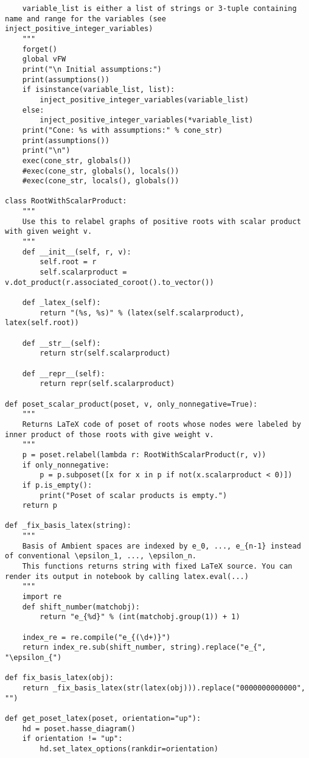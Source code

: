 \begin{verbatim}
    variable_list is either a list of strings or 3-tuple containing name and range for the variables (see inject_positive_integer_variables)
    """
    forget()
    global vFW
    print("\n Initial assumptions:")
    print(assumptions())
    if isinstance(variable_list, list):
        inject_positive_integer_variables(variable_list)
    else:
        inject_positive_integer_variables(*variable_list)
    print("Cone: %s with assumptions:" % cone_str)
    print(assumptions())
    print("\n")
    exec(cone_str, globals())
    #exec(cone_str, globals(), locals())
    #exec(cone_str, locals(), globals())

class RootWithScalarProduct:
    """
    Use this to relabel graphs of positive roots with scalar product with given weight v.
    """
    def __init__(self, r, v):
        self.root = r
        self.scalarproduct = v.dot_product(r.associated_coroot().to_vector())

    def _latex_(self):
        return "(%s, %s)" % (latex(self.scalarproduct), latex(self.root))

    def __str__(self):
        return str(self.scalarproduct)

    def __repr__(self):
        return repr(self.scalarproduct)

def poset_scalar_product(poset, v, only_nonnegative=True):
    """
    Returns LaTeX code of poset of roots whose nodes were labeled by inner product of those roots with give weight v.
    """
    p = poset.relabel(lambda r: RootWithScalarProduct(r, v))
    if only_nonnegative:
        p = p.subposet([x for x in p if not(x.scalarproduct < 0)])
    if p.is_empty():
        print("Poset of scalar products is empty.")
    return p

def _fix_basis_latex(string):
    """
    Basis of Ambient spaces are indexed by e_0, ..., e_{n-1} instead of conventional \epsilon_1, ..., \epsilon_n.
    This functions returns string with fixed LaTeX source. You can render its output in notebook by calling latex.eval(...)
    """
    import re
    def shift_number(matchobj):
        return "e_{%d}" % (int(matchobj.group(1)) + 1)

    index_re = re.compile("e_{(\d+)}")
    return index_re.sub(shift_number, string).replace("e_{", "\epsilon_{")

def fix_basis_latex(obj):
    return _fix_basis_latex(str(latex(obj))).replace("0000000000000", "")

def get_poset_latex(poset, orientation="up"):
    hd = poset.hasse_diagram()
    if orientation != "up":
        hd.set_latex_options(rankdir=orientation)


\end{verbatim}
